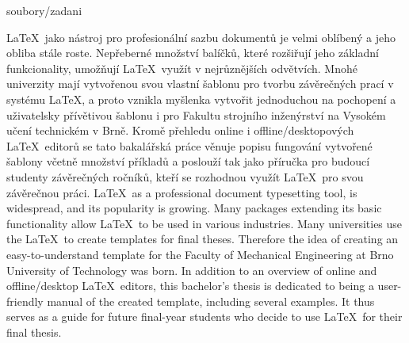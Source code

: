 \documentclass[12pt,a4paper,twoside]{book}
\begin{document}


\cleardoublepage


	     {soubory/zadani}

\cleardoublepage

\abstrakt
{\LaTeX\ jako nástroj pro profesionální sazbu dokumentů je velmi oblíbený a jeho obliba stále roste. Nepřeberné množství balíčků, které rozšiřují jeho základní funkcionality, umožňují \LaTeX\ využít v nejrůznějších odvětvích. Mnohé univerzity mají vytvořenou svou vlastní šablonu pro tvorbu závěrečných prací v systému \LaTeX, a proto vznikla myšlenka vytvořit jednoduchou na pochopení a uživatelsky přívětivou šablonu i pro Fakultu strojního inženýrství na Vysokém učení technickém v Brně. Kromě přehledu online i offline/desktopových \LaTeX\ editorů se tato bakalářská práce věnuje popisu fungování vytvořené šablony včetně množství příkladů a poslouží tak jako příručka pro budoucí studenty závěrečných ročníků, kteří se rozhodnou využít \LaTeX\ pro svou závěrečnou práci.}
{\LaTeX\, as a professional document typesetting tool, is widespread, and its popularity is growing. Many packages extending its basic functionality allow \LaTeX\ to be used in various industries. Many universities use the \LaTeX\ to create templates for final theses. Therefore the idea of creating an easy-to-understand template for the Faculty of Mechanical Engineering at Brno University of Technology was born. In addition to an overview of online and offline/desktop \LaTeX\ editors, this bachelor's thesis is dedicated to being a user-friendly manual of the created template, including several examples. It thus serves as a guide for future final-year students who decide to use \LaTeX\ for their final thesis.}
\end{document}
